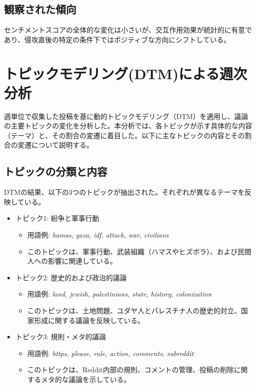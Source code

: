 \documentclass[11pt, a4j]{jreport}
\begin{document}
    \subsection*{観察された傾向}
    センチメントスコアの全体的な変化は小さいが、交互作用効果が統計的に有意であり、侵攻直後の特定の条件下ではポジティブな方向にシフトしている。

    \section{トピックモデリング(DTM)による週次分析}

    週単位で収集した投稿を基に動的トピックモデリング（DTM）を適用し、議論の主要トピックの変化を分析した。本分析では、各トピックが示す具体的な内容（テーマ）と、その割合の変遷に着目した。以下に主なトピックの内容とその割合の変遷について説明する。

    \subsection*{トピックの分類と内容}
    DTMの結果、以下の3つのトピックが抽出された。それぞれが異なるテーマを反映している。

    \begin{itemize}
        \item トピック1: 紛争と軍事行動 
        \begin{itemize}
            \item 用語例: \textit{hamas, gaza, idf, attack, war, civilians}  
            \item このトピックは、軍事行動、武装組織（ハマスやヒズボラ）、および民間人への影響に関連している。
        \end{itemize}
        \item トピック2: 歴史的および政治的議論  
        \begin{itemize}
            \item 用語例: \textit{land, jewish, palestinians, state, history, colonization}  
            \item このトピックは、土地問題、ユダヤ人とパレスチナ人の歴史的対立、国家形成に関する議論を反映している。
        \end{itemize}
        \item トピック3: 規則・メタ的議論  
        \begin{itemize}
            \item 用語例: \textit{https, please, rule, action, comments, subreddit}  
            \item このトピックは、Reddit内部の規則、コメントの管理、投稿の削除に関するメタ的な議論を示している。
        \end{itemize}
    \end{itemize}
\end{document}
